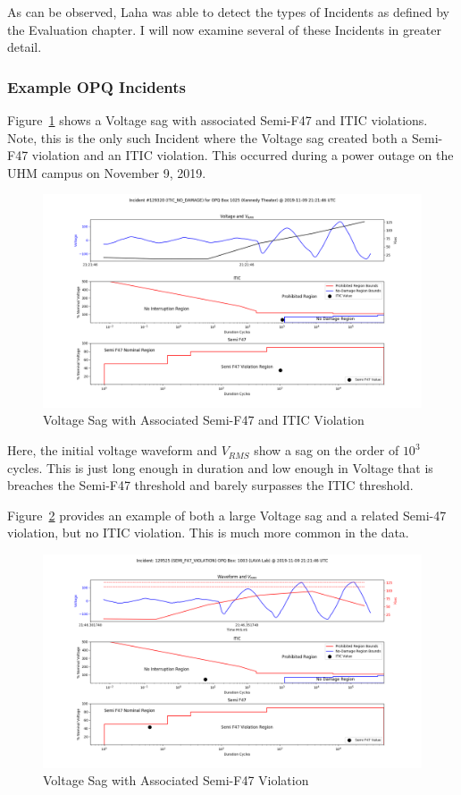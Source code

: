 As can be observed, Laha was able to detect the types of Incidents as defined by the Evaluation chapter. I will now examine several of these Incidents in greater detail.

\subsubsection{Example OPQ Incidents}

Figure~\ref{fig:vsag_semi_itic} shows a Voltage sag with associated Semi-F47 and ITIC violations. Note, this is the only such Incident where the Voltage sag created both a Semi-F47 violation and an ITIC violation. This occurred during a power outage on the UHM campus on November 9, 2019.

\begin{figure}[H]
    \centering
    \includegraphics[width=\linewidth]{figures/semi_itic.png}
    \caption{Voltage Sag with Associated Semi-F47 and ITIC Violation}
    \label{fig:vsag_semi_itic}
\end{figure}

Here, the initial voltage waveform and $V_{RMS}$ show a sag on the order of $10^3$ cycles. This is just long enough in duration and low enough in Voltage that is breaches the Semi-F47 threshold and barely surpasses the ITIC threshold.

Figure~\ref{fig:vsag_semi} provides an example of both a large Voltage sag and a related Semi-47 violation, but no ITIC violation. This is much more common in the data.

\begin{figure}[H]
    \centering
    \includegraphics[width=\linewidth]{figures/voltage-incident-129525.png}
    \caption{Voltage Sag with Associated Semi-F47 Violation}
    \label{fig:vsag_semi}
\end{figure}

